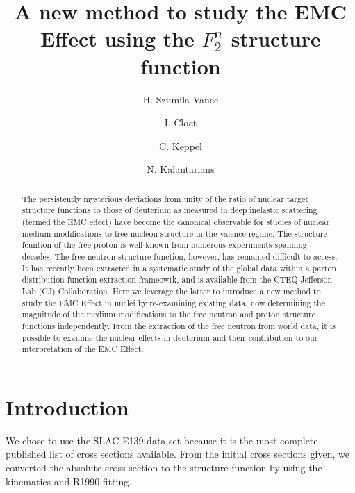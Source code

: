 \documentclass[oneside]{article}
\title{\vspace{-15mm}\fontsize{20pt}{10pt}\selectfont\textbf{A new method to study the EMC Effect using the $F_2^{n}$ structure function}} %
\author[1]{H. Szumila-Vance}
\author[2]{I. Cloet}
\author[1]{C. Keppel}
\author[3]{N. Kalantarians}
\affil[1]{Thomas Jefferson National Accelerator Facility, Newport News, VA}
\affil[2]{Argonne National Laboratory, Argonne, IL}
\affil[3]{Virginia Union University, Richmond, VA}
\date{}
\begin{document}
\maketitle %

\thispagestyle{fancy} %


\begin{abstract}
The persistently mysterious deviations from unity of the ratio of nuclear target structure functions to those of deuterium as measured in deep inelastic scattering (termed the EMC effect) have become the canonical observable for studies of nuclear medium modifications to free nucleon structure in the valence regime. The structure fcuntion of the free proton is well known from numerous experiments spanning decades. The free neutron structure function, however, has remained difficult to access. It has recently been extracted in a systematic study of the global data within a parton distribution function extraction frameowrk, and is available from the CTEQ-Jefferson Lab (CJ) Collaboration. Here we leverage the latter to introduce a new method to study the EMC Effect in nuclei by re-examining existing data, now determining the magnitude of the medium modifications to the free neutron and proton structure functions independently. From the extraction of the free neutron from world data, it is possible to examine the nuclear effects in deuterium and their contribution to our interpretation of the EMC Effect.

\end{abstract}


\section{Introduction}

We chose to use the SLAC E139 data set because it is the most complete published list of cross sections available. From the initial cross sections given, we converted the absolute cross section to the structure function by using the kinematics and R1990 fitting. 
\end{document}
